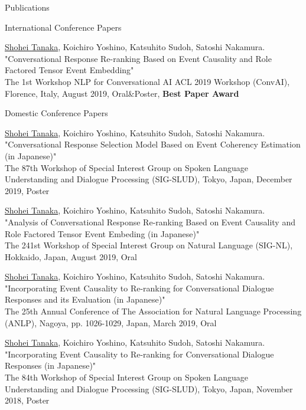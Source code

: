 \documentclass{resume} %
\begin{document}
\begin{rSection}{Publications}

\begin{rSubsection}{International Conference Papers}{}{}{}
\item \underline{Shohei Tanaka}, Koichiro Yoshino, Katsuhito Sudoh, Satoshi Nakamura.
\\"Conversational Response Re-ranking Based on Event Causality and Role Factored Tensor Event Embedding"
\\The 1st Workshop NLP for Conversational AI ACL 2019 Workshop (ConvAI), Florence, Italy, August 2019, Oral\&Poster, {\bf Best Paper Award}
\end{rSubsection}

\newpage

\begin{rSubsection}{Domestic Conference Papers}{}{}{}
\item \underline{Shohei Tanaka}, Koichiro Yoshino, Katsuhito Sudoh, Satoshi Nakamura.
\\"Conversational Response Selection Model Based on Event Coherency Estimation (in Japanese)"
\\The 87th Workshop of Special Interest Group on Spoken Language Understanding and Dialogue Processing (SIG-SLUD), Tokyo, Japan, December 2019, Poster

\item \underline{Shohei Tanaka}, Koichiro Yoshino, Katsuhito Sudoh, Satoshi Nakamura.
\\"Analysis of Conversational Response Re-ranking Based on Event Causality and Role Factored Tensor Event Embeding (in Japanese)"
\\The 241st Workshop of Special Interest Group on Natural Language (SIG-NL), Hokkaido, Japan, August 2019, Oral

\item \underline{Shohei Tanaka}, Koichiro Yoshino, Katsuhito Sudoh, Satoshi Nakamura.
\\"Incorporating Event Causality to Re-ranking for Conversational Dialogue Responses and its Evaluation (in Japanese)"
\\The 25th Annual Conference of The Association for Natural Language Processing (ANLP), Nagoya, pp. 1026-1029, Japan, March 2019, Oral

\item \underline{Shohei Tanaka}, Koichiro Yoshino, Katsuhito Sudoh, Satoshi Nakamura.
\\"Incorporating Event Causality to Re-ranking for Conversational Dialogue Responses (in Japanese)"
\\The 84th Workshop of Special Interest Group on Spoken Language Understanding and Dialogue Processing (SIG-SLUD), Tokyo, Japan, November 2018, Poster


\end{rSubsection}
\end{rSection}
\end{document}
